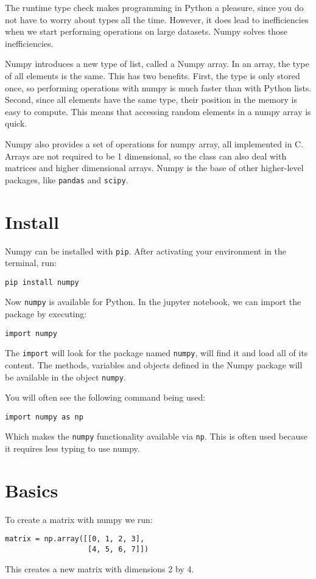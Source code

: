 \documentclass[12pt, a4paper]{article}
\begin{document}
The runtime type check makes programming in Python a pleasure, since you do not have to worry about types all the time.
However, it does lead to inefficiencies when we start performing operations on large datasets.
Numpy solves those inefficiencies.

Numpy introduces a new type of list, called a Numpy array.
In an array, the type of all elements is the same.
This has two benefits.
First, the type is only stored once, so performing operations with numpy is much faster than with Python lists.
Second, since all elements have the same type, their position in the memory is easy to compute.
This means that accessing random elements in a numpy array is quick.

Numpy also provides a set of operations for numpy array, all implemented in C.
Arrays are not required to be 1 dimensional, so the class can also deal with matrices and higher dimensional arrays.
Numpy is the base of other higher-level packages, like \texttt{pandas} and \texttt{scipy}.
\section{Install}
\label{sec:org3d462ad}
Numpy can be installed with \texttt{pip}.
After activating your environment in the terminal, run:
\lstset{language=jupyter-python,label= ,caption= ,captionpos=b,numbers=none}
\begin{lstlisting}
pip install numpy
\end{lstlisting}
Now \texttt{numpy} is available for Python.
In the jupyter notebook, we can import the package by executing:
\lstset{language=jupyter-python,label= ,caption= ,captionpos=b,numbers=none}
\begin{lstlisting}
import numpy
\end{lstlisting}
The \texttt{import} will look for the package named \texttt{numpy}, will find it and load all of its content.
The methods, variables and objects defined in the Numpy package will be available in the object \texttt{numpy}.

You will often see the following command being used:
\lstset{language=jupyter-python,label= ,caption= ,captionpos=b,numbers=none}
\begin{lstlisting}
import numpy as np
\end{lstlisting}
Which makes the \texttt{numpy} functionality available via \texttt{np}.
This is often used because it requires less typing to use numpy.
\section{Basics}
\label{sec:org89f9729}
To create a matrix with numpy we run:
\lstset{language=jupyter-python,label= ,caption= ,captionpos=b,numbers=none}
\begin{lstlisting}
matrix = np.array([[0, 1, 2, 3],
                   [4, 5, 6, 7]])
\end{lstlisting}
This creates a new matrix with dimensions 2 by 4.
\end{document}
